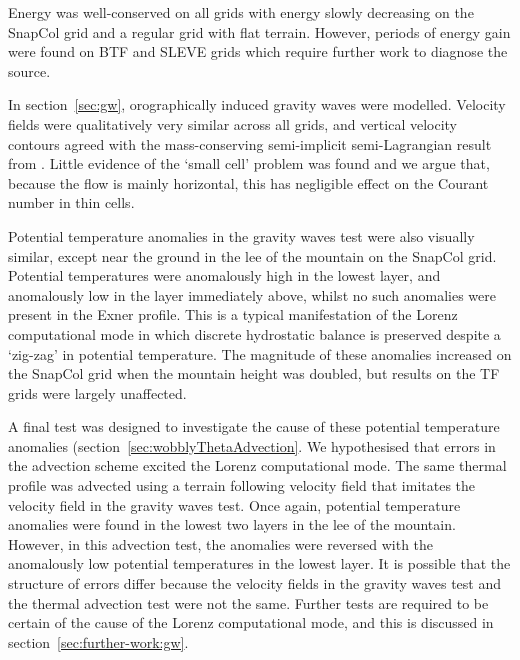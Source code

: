 Energy was well-conserved on all grids with energy slowly decreasing on the SnapCol grid and a regular grid with flat terrain.  However, periods of energy gain were found on BTF and SLEVE grids which require further work to diagnose the source.

In section~\ref{sec:gw}, orographically induced gravity waves were modelled.  Velocity fields were qualitatively very similar across all grids, and vertical velocity contours agreed with the mass-conserving semi-implicit semi-Lagrangian result from \textcite{melvin2010}.  Little evidence of the `small cell' problem was found and we argue that, because the flow is mainly horizontal, this has negligible effect on the Courant number in thin cells.

Potential temperature anomalies in the gravity waves test were also visually similar, except near the ground in the lee of the mountain on the SnapCol grid.  Potential temperatures were anomalously high in the lowest layer, and anomalously low in the layer immediately above, whilst no such anomalies were present in the Exner profile.  This is a typical manifestation of the Lorenz computational mode in which discrete hydrostatic balance is preserved despite a `zig-zag' in potential temperature.
The magnitude of these anomalies increased on the SnapCol grid when the mountain height was doubled, but results on the TF grids were largely unaffected.

A final test was designed to investigate the cause of these potential temperature anomalies (section~\ref{sec:wobblyThetaAdvection}.  We hypothesised that errors in the advection scheme excited the Lorenz computational mode.  The same thermal profile was advected using a terrain following velocity field that imitates the velocity field in the gravity waves test.  Once again, potential temperature anomalies were found in the lowest two layers in the lee of the mountain.  However, in this advection test, the anomalies were reversed with the anomalously low potential temperatures in the lowest layer.  It is possible that the structure of errors differ because the velocity fields in the gravity waves test and the thermal advection test were not the same.  Further tests are required to be certain of the cause of the Lorenz computational mode, and this is discussed in section~\ref{sec:further-work:gw}.
